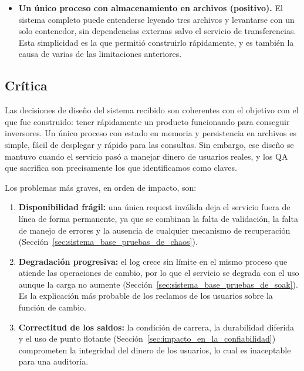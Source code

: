         \begin{itemize}
            \item \textbf{Un único proceso con almacenamiento en archivos (positivo).} El
            sistema completo puede entenderse leyendo tres archivos y levantarse con un
            solo contenedor, sin dependencias externas salvo el servicio de transferencias.
            Esta simplicidad es la que permitió construirlo rápidamente, y es también la
            causa de varias de las limitaciones anteriores.
        \end{itemize}

    \subsection{Crítica}
    \label{sec:critica}

        Las decisiones de diseño del sistema recibido son coherentes con el objetivo con
        el que fue construido: tener rápidamente un producto funcionando para conseguir
        inversores. Un único proceso con estado en memoria y persistencia en archivos es
        simple, fácil de desplegar y rápido para las consultas. Sin embargo, ese diseño se
        mantuvo cuando el servicio pasó a manejar dinero de usuarios reales, y los QA que
        sacrifica son precisamente los que identificamos como claves.

        Los problemas más graves, en orden de impacto, son:

        \begin{enumerate}
            \item \textbf{Disponibilidad frágil:} una única request inválida deja el
            servicio fuera de línea de forma permanente, ya que se combinan la falta de
            validación, la falta de manejo de errores y la ausencia de cualquier mecanismo
            de recuperación (Sección~\ref{sec:sistema_base_pruebas_de_chaos}).
            \item \textbf{Degradación progresiva:} el log crece sin límite en el mismo
            proceso que atiende las operaciones de cambio, por lo que el servicio se
            degrada con el uso aunque la carga no aumente (Sección~\ref{sec:sistema_base_pruebas_de_soak}). Es la explicación más probable
            de los reclamos de los usuarios sobre la función de cambio.
            \item \textbf{Correctitud de los saldos:} la condición de carrera, la
            durabilidad diferida y el uso de punto flotante (Sección~\ref{sec:impacto_en_la_confiabilidad}) comprometen la integridad del
            dinero de los usuarios, lo cual es inaceptable para una auditoría.
        \end{enumerate}

